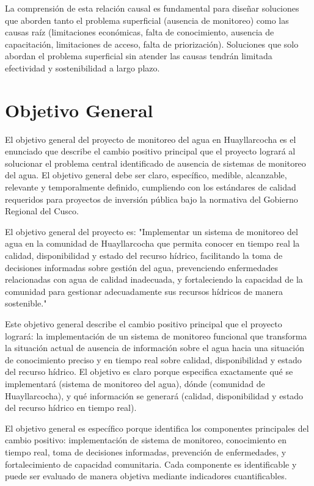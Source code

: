 La comprensión de esta relación causal es fundamental para diseñar soluciones que aborden tanto el problema superficial (ausencia de monitoreo) como las causas raíz (limitaciones económicas, falta de conocimiento, ausencia de capacitación, limitaciones de acceso, falta de priorización). Soluciones que solo abordan el problema superficial sin atender las causas tendrán limitada efectividad y sostenibilidad a largo plazo.

\section{Objetivo General}

El objetivo general del proyecto de monitoreo del agua en Huayllarcocha es el enunciado que describe el cambio positivo principal que el proyecto logrará al solucionar el problema central identificado de ausencia de sistemas de monitoreo del agua. El objetivo general debe ser claro, específico, medible, alcanzable, relevante y temporalmente definido, cumpliendo con los estándares de calidad requeridos para proyectos de inversión pública bajo la normativa del Gobierno Regional del Cusco.

El objetivo general del proyecto es: "Implementar un sistema de monitoreo del agua en la comunidad de Huayllarcocha que permita conocer en tiempo real la calidad, disponibilidad y estado del recurso hídrico, facilitando la toma de decisiones informadas sobre gestión del agua, prevenciendo enfermedades relacionadas con agua de calidad inadecuada, y fortaleciendo la capacidad de la comunidad para gestionar adecuadamente sus recursos hídricos de manera sostenible."

Este objetivo general describe el cambio positivo principal que el proyecto logrará: la implementación de un sistema de monitoreo funcional que transforma la situación actual de ausencia de información sobre el agua hacia una situación de conocimiento preciso y en tiempo real sobre calidad, disponibilidad y estado del recurso hídrico. El objetivo es claro porque especifica exactamente qué se implementará (sistema de monitoreo del agua), dónde (comunidad de Huayllarcocha), y qué información se generará (calidad, disponibilidad y estado del recurso hídrico en tiempo real).

El objetivo general es específico porque identifica los componentes principales del cambio positivo: implementación de sistema de monitoreo, conocimiento en tiempo real, toma de decisiones informadas, prevención de enfermedades, y fortalecimiento de capacidad comunitaria. Cada componente es identificable y puede ser evaluado de manera objetiva mediante indicadores cuantificables.

